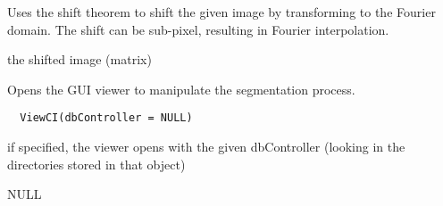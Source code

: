 \documentclass[a4paper]{book}
\begin{document}
%
\begin{Details}\relax
Uses the shift theorem to shift the given image by
transforming to the Fourier domain.  The shift can be
sub-pixel, resulting in Fourier interpolation.
\end{Details}
%
\begin{Value}
the shifted image (matrix)
\end{Value}
%
\begin{Description}\relax
Opens the GUI viewer to manipulate the segmentation
process.
\end{Description}
%
\begin{Usage}
\begin{verbatim}
  ViewCI(dbController = NULL)
\end{verbatim}
\end{Usage}
%
\begin{Arguments}
\begin{ldescription}
\item[\code{dbController}] if specified, the viewer opens with
the given dbController (looking in the directories stored
in that object)
\end{ldescription}
\end{Arguments}
%
\begin{Value}
NULL
\end{Value}
\printindex{}
\end{document}
